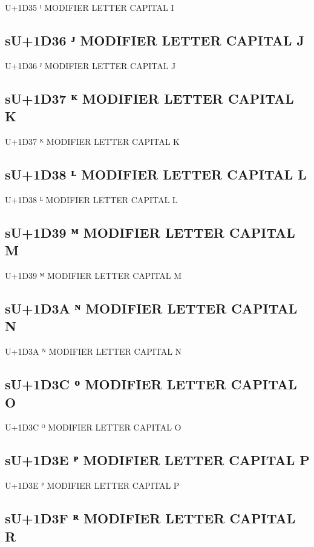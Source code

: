 U+1D35 ᴵ MODIFIER LETTER CAPITAL I

\subsection{sU+1D36 ᴶ MODIFIER LETTER CAPITAL J}

U+1D36 ᴶ MODIFIER LETTER CAPITAL J

\subsection{sU+1D37 ᴷ MODIFIER LETTER CAPITAL K}

U+1D37 ᴷ MODIFIER LETTER CAPITAL K

\subsection{sU+1D38 ᴸ MODIFIER LETTER CAPITAL L}

U+1D38 ᴸ MODIFIER LETTER CAPITAL L

\subsection{sU+1D39 ᴹ MODIFIER LETTER CAPITAL M}

U+1D39 ᴹ MODIFIER LETTER CAPITAL M

\subsection{sU+1D3A ᴺ MODIFIER LETTER CAPITAL N}

U+1D3A ᴺ MODIFIER LETTER CAPITAL N

\subsection{sU+1D3C ᴼ MODIFIER LETTER CAPITAL O}

U+1D3C ᴼ MODIFIER LETTER CAPITAL O

\subsection{sU+1D3E ᴾ MODIFIER LETTER CAPITAL P}

U+1D3E ᴾ MODIFIER LETTER CAPITAL P

\subsection{sU+1D3F ᴿ MODIFIER LETTER CAPITAL R}

